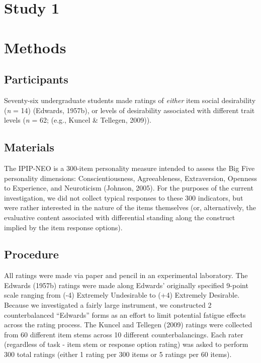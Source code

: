 \documentclass[
  english,
  ,jou]{apa6}
\begin{document}
\hypertarget{study-1}{%
\section{Study 1}\label{study-1}}

\hypertarget{methods}{%
\section{Methods}\label{methods}}

\hypertarget{participants}{%
\subsection{Participants}\label{participants}}

Seventy-six undergraduate students made ratings of \emph{either} item social desirability (\emph{n} = 14) (Edwards, 1957b), or levels of desirability associated with different trait levels (\emph{n} = 62; (e.g., Kuncel \& Tellegen, 2009)).

\hypertarget{materials}{%
\subsection{Materials}\label{materials}}

The IPIP-NEO is a 300-item personality measure intended to assess the Big Five personality dimensions: Conscientiousness, Agreeableness, Extraversion, Openness to Experience, and Neuroticism (Johnson, 2005). For the purposes of the current investigation, we did not collect typical responses to these 300 indicators, but were rather interested in the nature of the items themselves (or, alternatively, the evaluative content associated with differential standing along the construct implied by the item response options).

\hypertarget{procedure}{%
\subsection{Procedure}\label{procedure}}

All ratings were made via paper and pencil in an experimental laboratory. The Edwards (1957b) ratings were made along Edwards' originally specified 9-point scale ranging from (-4) Extremely Undesirable to (+4) Extremely Desirable. Because we investigated a fairly large instrument, we constructed 2 counterbalanced ``Edwards'' forms as an effort to limit potential fatigue effects across the rating process. The Kuncel and Tellegen (2009) ratings were collected from 60 different item stems across 10 different counterbalancings. Each rater (regardless of task - item stem or response option rating) was asked to perform 300 total ratings (either 1 rating per 300 items or 5 ratings per 60 items).
\end{document}
